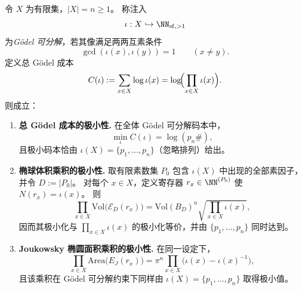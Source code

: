 \begin{theorem}\label{prop:group-jg-min-total-godel-cost-primorial}
令 \(X\) 为有限集，\(|X|=n\ge 1\)。
称注入
\[
\iota:X\hookrightarrow \NN_{\mathrm{sf},>1}
\]
为\emph{Gödel 可分解}，若其像满足两两互素条件
\[
\gcd(\iota(x),\iota(y))=1\qquad (x\neq y).
\]
定义总 Gödel 成本
\[
C(\iota):=\sum_{x\in X}\log \iota(x)
=\log\!\Bigl(\prod_{x\in X}\iota(x)\Bigr).
\]
则成立：
\begin{enumerate}
  \item \textbf{总 Gödel 成本的极小性.}
        在全体 Gödel 可分解码本中，
        \[
        \min_{\iota} C(\iota)=\log(p_n\#),
        \]
        且极小码本恰由 \(\iota(X)=\{p_1,\dots,p_n\}\)（忽略排列）给出。
  \item \textbf{椭球体积乘积的极小性.}
        取有限素数集 \(P_0\) 包含 \(\iota(X)\) 中出现的全部素因子，并令 \(D:=|P_0|\)。
        对每个 \(x\in X\)，定义寄存器 \(r_x\in\NN^{(P_0)}\) 使 \(N(r_x)=\iota(x)\)。
        则
        \[
        \prod_{x\in X}\mathrm{Vol}\bigl(\mathcal E_D(r_x)\bigr)
        =
        \mathrm{Vol}(B_D)^n\sqrt{\prod_{x\in X}\iota(x)},
        \]
        因而其极小化与 \(\prod_{x\in X}\iota(x)\) 的极小化等价，并由 \(\{p_1,\dots,p_n\}\) 同时达到。
  \item \textbf{Joukowsky 椭圆面积乘积的极小性.}
        在同一设定下，
        \[
        \prod_{x\in X}\mathrm{Area}\bigl(E_J(r_x)\bigr)
        =
        \pi^n\prod_{x\in X}\bigl(\iota(x)-\iota(x)^{-1}\bigr),
        \]
        且该乘积在 Gödel 可分解约束下同样由 \(\iota(X)=\{p_1,\dots,p_n\}\) 取得极小值。
\end{enumerate}
\end{theorem}

